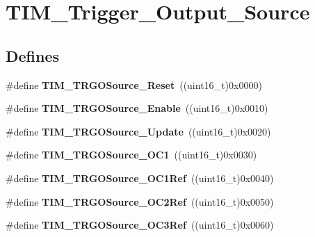\hypertarget{group__TIM__Trigger__Output__Source}{
\section{TIM\_\-Trigger\_\-Output\_\-Source}
\label{group__TIM__Trigger__Output__Source}
}
\subsection*{Defines}
\begin{DoxyCompactItemize}
\item 
\hypertarget{group__TIM__Trigger__Output__Source_gafb039ed39279a4d1134b234797b1cdfb}{
\#define {\bfseries TIM\_\-TRGOSource\_\-Reset}~((uint16\_\-t)0x0000)}
\label{group__TIM__Trigger__Output__Source_gafb039ed39279a4d1134b234797b1cdfb}

\item 
\hypertarget{group__TIM__Trigger__Output__Source_gaa228ba6cfafcf676e33e3ee35cb7fc1c}{
\#define {\bfseries TIM\_\-TRGOSource\_\-Enable}~((uint16\_\-t)0x0010)}
\label{group__TIM__Trigger__Output__Source_gaa228ba6cfafcf676e33e3ee35cb7fc1c}

\item 
\hypertarget{group__TIM__Trigger__Output__Source_ga8a73c717070ab1a0ef90326780f20aef}{
\#define {\bfseries TIM\_\-TRGOSource\_\-Update}~((uint16\_\-t)0x0020)}
\label{group__TIM__Trigger__Output__Source_ga8a73c717070ab1a0ef90326780f20aef}

\item 
\hypertarget{group__TIM__Trigger__Output__Source_ga2d044b472c021f5484b9f71eb9ca69f1}{
\#define {\bfseries TIM\_\-TRGOSource\_\-OC1}~((uint16\_\-t)0x0030)}
\label{group__TIM__Trigger__Output__Source_ga2d044b472c021f5484b9f71eb9ca69f1}

\item 
\hypertarget{group__TIM__Trigger__Output__Source_ga7cb70a2a026dc02136bdbb3dcc483d6c}{
\#define {\bfseries TIM\_\-TRGOSource\_\-OC1Ref}~((uint16\_\-t)0x0040)}
\label{group__TIM__Trigger__Output__Source_ga7cb70a2a026dc02136bdbb3dcc483d6c}

\item 
\hypertarget{group__TIM__Trigger__Output__Source_ga059f9f6cf96c833180eb3cdf5e56bd04}{
\#define {\bfseries TIM\_\-TRGOSource\_\-OC2Ref}~((uint16\_\-t)0x0050)}
\label{group__TIM__Trigger__Output__Source_ga059f9f6cf96c833180eb3cdf5e56bd04}

\item 
\hypertarget{group__TIM__Trigger__Output__Source_ga40943bc1c3f22b983c683cbf0e87a218}{
\#define {\bfseries TIM\_\-TRGOSource\_\-OC3Ref}~((uint16\_\-t)0x0060)}
\label{group__TIM__Trigger__Output__Source_ga40943bc1c3f22b983c683cbf0e87a218}


\end{DoxyCompactItemize}
